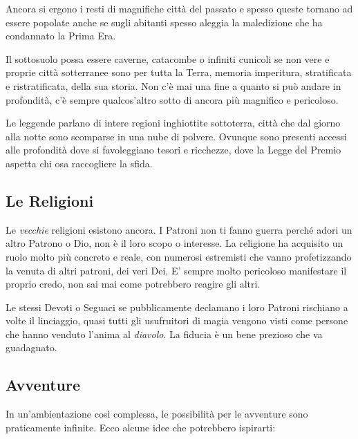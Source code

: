 \begin{multicols}{2}
Ancora si ergono i resti di magnifiche città del passato e spesso queste tornano ad essere popolate anche se sugli abitanti spesso aleggia la maledizione che ha condannato la Prima Era.

Il sottosuolo possa essere caverne, catacombe o infiniti cunicoli se non vere e proprie città sotterranee sono per tutta la Terra, memoria imperitura, stratificata e ristratificata, della sua storia. Non c'è mai una fine a quanto si può andare in profondità, c'è sempre qualcos'altro sotto di ancora più magnifico e pericoloso.

Le leggende parlano di intere regioni inghiottite sottoterra, città che dal giorno alla notte sono scomparse in una nube di polvere. Ovunque sono presenti accessi alle profondità dove si favoleggiano tesori e ricchezze, dove la Legge del Premio aspetta chi osa raccogliere la sfida.

\subsection{Le Religioni}

Le \emph{vecchie} religioni esistono ancora. I Patroni non ti fanno guerra perché adori un altro Patrono o Dio, non è il loro scopo o interesse. La religione ha acquisito un ruolo molto più concreto e reale, con numerosi estremisti che vanno profetizzando la venuta di altri patroni, dei veri Dei. E' sempre molto pericoloso manifestare il proprio credo, non sai mai come potrebbero reagire gli altri.

Le stessi Devoti o Seguaci se pubblicamente declamano i loro Patroni rischiano a volte il linciaggio, quasi tutti gli usufruitori di magia vengono visti come persone che hanno venduto l'anima al \emph{diavolo}. La fiducia è un bene prezioso che va guadagnato.

\subsection{Avventure}\label{avventure}

In un'ambientazione così complessa, le possibilità per le avventure sono praticamente infinite. Ecco alcune idee che potrebbero ispirarti:


\end{multicols}
